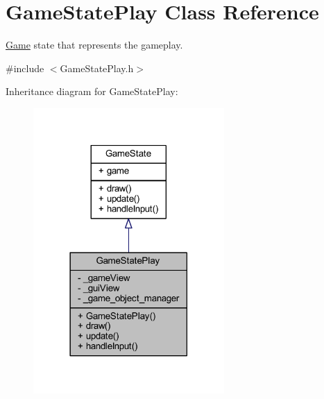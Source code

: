 \hypertarget{class_game_state_play}{\section{Game\+State\+Play Class Reference}
\label{class_game_state_play}
}


\hyperlink{class_game}{Game} state that represents the gameplay.  




{\ttfamily \#include $<$Game\+State\+Play.\+h$>$}



Inheritance diagram for Game\+State\+Play\+:
\nopagebreak
\begin{figure}[H]
\begin{center}
\leavevmode
\includegraphics[width=206pt]{class_game_state_play__inherit__graph}
\end{center}
\end{figure}


